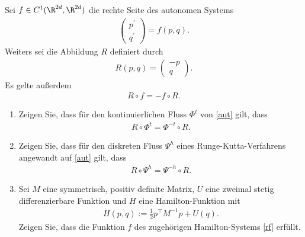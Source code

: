 \begin{exercise}
  Sei $f \in C^1(\R^{2d},\R^{2d})$ die rechte Seite des autonomen Systems
  \begin{align}\label{aut}
    \begin{pmatrix}
      p^{\prime} \\ q^{\prime}
    \end{pmatrix} = f(p,q).
  \end{align}
  Weiters sei die Abbildung $R$ definiert durch
  \begin{align}
    R(p,q) = \begin{pmatrix}
      -p \\ q
    \end{pmatrix}.
  \end{align}
  Es gelte außerdem
  \begin{align}\label{rf}
    R \circ f = -f \circ R.
  \end{align}
  \begin{enumerate}[label = \textbf{\alph*)}]
    \item Zeigen Sie, dass für den kontinuierlichen Fluss $\Phi^t$ von \eqref{aut}
    gilt, dass
    \begin{align*}
      R \circ \Phi^t = \Phi^{-t} \circ R.
    \end{align*}
    \item Zeigen Sie, dass für den diskreten Fluss $\Psi^h$ eines Runge-Kutta-Verfahrens angewandt auf \eqref{aut} gilt, dass
    \begin{align*}
      R \circ \Psi^h = \Psi^{-h} \circ R.
    \end{align*}
    \item Sei $M$ eine symmetrisch, positiv definite Matrix, $U$ eine zweimal
    stetig differenzierbare Funktion und $H$ eine Hamilton-Funktion mit
    \begin{align*}
      H(p,q) := \frac{1}{2}p^{\top}M^{-1}p + U(q).
    \end{align*}
    Zeigen Sie, dass die Funktion $f$ des zugehörigen Hamilton-Systems \eqref{rf}
    erfüllt.
  \end{enumerate}
\end{exercise}


